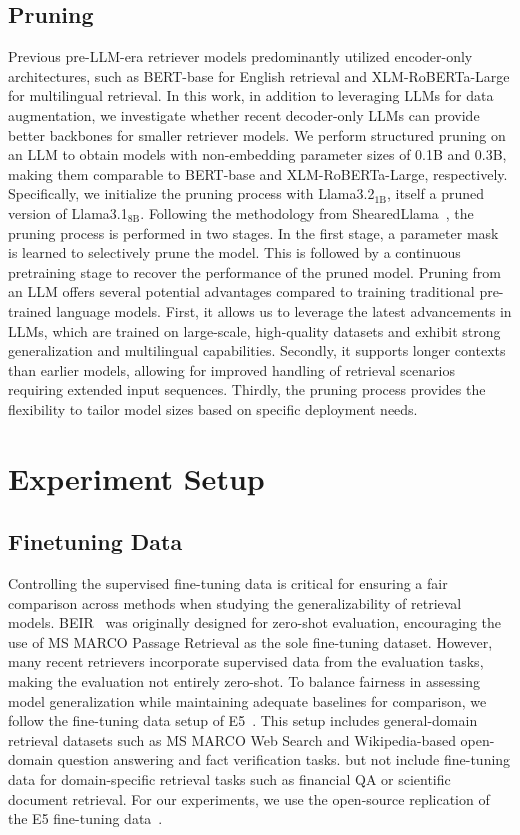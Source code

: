\documentclass[]{fairmeta}
\begin{document}
\subsection{Pruning}
Previous pre-LLM-era retriever models predominantly utilized encoder-only architectures, such as BERT-base for English retrieval and XLM-RoBERTa-Large for multilingual retrieval.
In this work, in addition to leveraging LLMs for data augmentation, we investigate whether recent decoder-only LLMs can provide better backbones for smaller retriever models.
We perform structured pruning on an LLM to obtain models with non-embedding parameter sizes of 0.1B and 0.3B, making them comparable to BERT-base and XLM-RoBERTa-Large, respectively.
Specifically, we initialize the pruning process with Llama3.2$_\text{1B}$, itself a pruned version of Llama3.1$_\text{8B}$.
Following the methodology from ShearedLlama~\citep{xia2024sheared}, the pruning process is performed in two stages.
In the first stage, a parameter mask is learned to selectively prune the model.
This is followed by a continuous pretraining stage to recover the performance of the pruned model.
Pruning from an LLM offers several potential advantages compared to training traditional pre-trained language models.
First, it allows us to leverage the latest advancements in LLMs, which are trained on large-scale, high-quality datasets and exhibit strong generalization and multilingual capabilities.
Secondly, it supports longer contexts than earlier models, allowing for improved handling of retrieval scenarios requiring extended input sequences. 
Thirdly, the pruning process provides the flexibility to tailor model sizes based on specific deployment needs.




\section{Experiment Setup}
\subsection{Finetuning Data}
\label{ft-data}
Controlling the supervised fine-tuning data is critical for ensuring a fair comparison across methods when studying the generalizability of retrieval models.
BEIR~\citep{thakur2021beir} was originally designed for zero-shot evaluation, encouraging the use of MS MARCO Passage Retrieval as the sole fine-tuning dataset.
However, many recent retrievers incorporate supervised data from the evaluation tasks, making the evaluation not entirely zero-shot.
To balance fairness in assessing model generalization while maintaining adequate baselines for comparison, we follow the fine-tuning data setup of E5~\citep{wang2024text}.
This setup includes general-domain retrieval datasets
such as MS MARCO Web Search and Wikipedia-based open-domain question answering and fact verification tasks.
but not include fine-tuning data for domain-specific retrieval tasks such as financial QA or scientific document retrieval.
For our experiments, we use the open-source replication of the E5 fine-tuning data~\citep{li2024making}.
\end{document}
